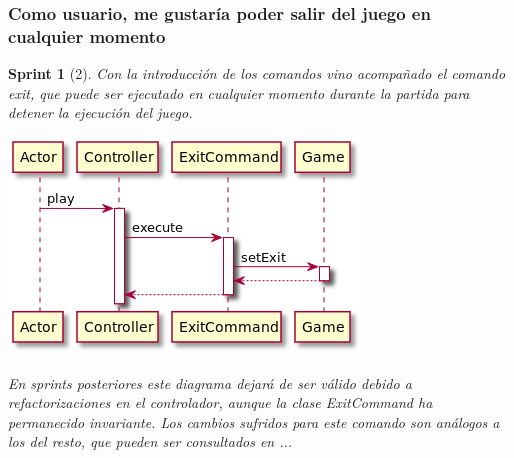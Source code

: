 \documentclass{article}
\theoremstyle{break}
\newtheorem*{sprint}{Sprint}
\begin{document}
\subsubsection{Como usuario, me gustaría poder salir del juego en cualquier momento}
\begin{sprint}[2]
Con la introducción de los comandos vino acompañado el comando exit, que puede ser ejecutado en cualquier momento durante la partida para detener la ejecución del juego.

\begin{center}
\includegraphics[scale=0.5]{exit-sprint2.png}
\end{center}

En sprints posteriores este diagrama dejará de ser válido debido a refactorizaciones en el controlador, aunque la clase ExitCommand ha permanecido invariante. Los cambios sufridos para este comando son análogos a los del resto, que pueden ser consultados en ... %
\end{sprint}
\end{document}
